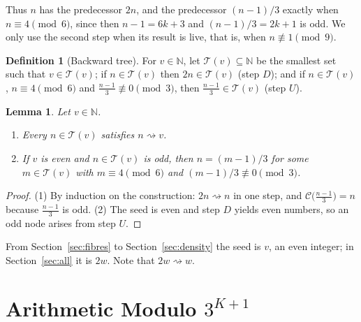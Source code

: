 \documentclass[11pt,reqno,oneside]{amsart}
\theoremstyle{plain}
\newtheorem{lemma}[theorem]{Lemma}
\theoremstyle{definition}
\newtheorem{definition}[theorem]{Definition}
\numberwithin{equation}{section}
\newcommand{\N}{\mathbb{N}}
\newcommand{\C}{\mathcal{C}}
\newcommand{\Tr}{\mathcal{T}}
\newcommand{\reaches}{\rightsquigarrow}
\begin{document}
Thus $n$ has the predecessor $2n$, and the predecessor $(n-1)/3$ exactly when $n\equiv 4\pmod 6$, since then $n-1=6k+3$ and $(n-1)/3=2k+1$ is odd. We only use the second step when its result is live, that is, when $n\not\equiv 1\pmod 9$.

\begin{definition}[Backward tree]
For $v\in\N$, let $\Tr(v)\subseteq\N$ be the smallest set such that $v\in\Tr(v)$; if $n\in\Tr(v)$ then $2n\in\Tr(v)$ (step $D$); and if $n\in\Tr(v)$, $n\equiv 4\pmod 6$ and $\tfrac{n-1}{3}\not\equiv 0\pmod 3$, then $\tfrac{n-1}{3}\in\Tr(v)$ (step $U$).
\end{definition}

\begin{lemma}\label{lem:tree_basic}
Let $v\in\N$.
\begin{enumerate}[label=(\arabic*), leftmargin=1.8em]
\item Every $n\in\Tr(v)$ satisfies $n\reaches v$.
\item If $v$ is even and $n\in\Tr(v)$ is odd, then $n=(m-1)/3$ for some $m\in\Tr(v)$ with $m\equiv 4\pmod 6$ and $(m-1)/3\not\equiv0\pmod 3$.
\end{enumerate}
\end{lemma}
\begin{proof}
(1) By induction on the construction: $2n\reaches n$ in one step, and $\C\bigl(\tfrac{n-1}{3}\bigr)=n$ because $\tfrac{n-1}{3}$ is odd. (2) The seed is even and step $D$ yields even numbers, so an odd node arises from step $U$.
\end{proof}

From Section~\ref{sec:fibres} to Section~\ref{sec:density} the seed is $v$, an even integer; in Section~\ref{sec:all} it is $2w$. Note that $2w\reaches w$.

\section{Arithmetic Modulo \texorpdfstring{$3^{K+1}$}{3\string^(K+1)}}\label{sec:arith}
\end{document}
